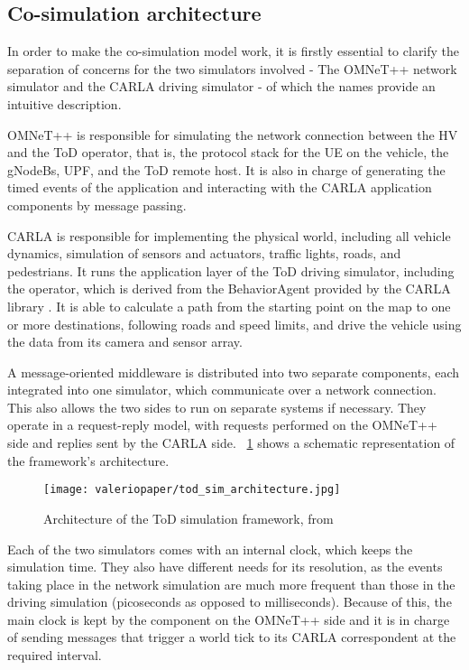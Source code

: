 \subsection{Co-simulation architecture}

In order to make the co-simulation model work, it is firstly essential to clarify the separation of concerns for the two simulators involved - The OMNeT++ network simulator and the CARLA driving simulator - of which the names provide an intuitive description.

OMNeT++ is responsible for simulating the network connection between the HV and the ToD operator, that is, the protocol stack for the UE on the vehicle, the gNodeBs, UPF, and the ToD remote host. It is also in charge of generating the timed events of the application and interacting with the CARLA application components by message passing.

CARLA is responsible for implementing the physical world, including all vehicle dynamics, simulation of sensors and actuators, traffic lights, roads, and pedestrians. It runs the application layer of the ToD driving simulator, including the operator, which is derived from the BehaviorAgent provided by the CARLA library \cite{carladoc}. It is able to calculate a path from the starting point on the map to one or more destinations, following roads and speed limits, and drive the vehicle using the data from its camera and sensor array.

A message-oriented middleware is distributed into two separate components, each integrated into one simulator, which communicate over a network connection. This also allows the two sides to run on separate systems if necessary. They operate in a request-reply model, with requests performed on the OMNeT++ side and replies sent by the CARLA side. \figurename~\ref{fig:tod_sim_architecture} shows a schematic representation of the framework's architecture.

\begin{figure}[h]
    \centering
    \texttt{[image: valeriopaper/tod\_sim\_architecture.jpg]}
    \caption{Architecture of the ToD simulation framework, from \cite{valeriopaper}}
    \label{fig:tod_sim_architecture}
\end{figure}

Each of the two simulators comes with an internal clock, which keeps the simulation time. They also have different needs for its resolution, as the events taking place in the network simulation are much more frequent than those in the driving simulation (picoseconds as opposed to milliseconds). Because of this, the main clock is kept by the component on the OMNeT++ side and it is in charge of sending messages that trigger a world tick to its CARLA correspondent at the required interval.

